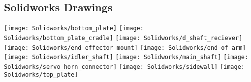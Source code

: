 \begin{flushleft}
\section{Solidworks Drawings}
\end{flushleft}
\label{app:SolidworksDrawings}
\centering
\texttt{[image: Solidworks/bottom\_plate]} \newpage
\texttt{[image: Solidworks/bottom\_plate\_cradle]} \newpage
\texttt{[image: Solidworks/d\_shaft\_reciever]} \newpage
\texttt{[image: Solidworks/end\_effector\_mount]} \newpage
\texttt{[image: Solidworks/end\_of\_arm]} \newpage
\texttt{[image: Solidworks/idler\_shaft]} \newpage
\texttt{[image: Solidworks/main\_shaft]} \newpage
\texttt{[image: Solidworks/servo\_horn\_connector]} \newpage
\texttt{[image: Solidworks/sidewall]} \newpage
\texttt{[image: Solidworks/top\_plate]} \newpage
